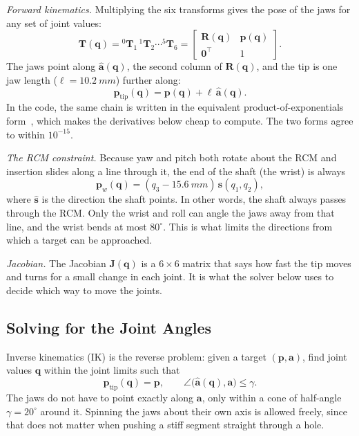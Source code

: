 \textit{Forward kinematics.} Multiplying the six transforms gives the pose of
the jaws for any set of joint values:
\begin{equation}
  \mathbf T(\mathbf q)={}^{0}\mathbf T_1\,{}^{1}\mathbf T_2\cdots{}^{5}\mathbf T_6
  =\begin{bmatrix}\mathbf R(\mathbf q)&\mathbf p(\mathbf q)\\\mathbf 0^\top&1\end{bmatrix}.
\end{equation}
The jaws point along $\hat{\mathbf a}(\mathbf q)$, the second column of
$\mathbf R(\mathbf q)$, and the tip is one jaw length
($\ell=\SI{10.2}{mm}$) further along:
\begin{equation}
  \mathbf p_{\mathrm{tip}}(\mathbf q)=\mathbf p(\mathbf q)+\ell\,\hat{\mathbf a}(\mathbf q).
\end{equation}
In the code, the same chain is written in the equivalent
product-of-exponentials form~\cite{lynch2017modern}, which makes the
derivatives below cheap to compute. The two forms agree to within
$10^{-15}$.

\textit{The RCM constraint.} Because yaw and pitch both rotate about the RCM
and insertion slides along a line through it, the end of the shaft (the
wrist) is always
\begin{equation}
  \mathbf p_w(\mathbf q)=(q_3-\SI{15.6}{mm})\,\hat{\mathbf s}(q_1,q_2),
\end{equation}
where $\hat{\mathbf s}$ is the direction the shaft points. In other words,
the shaft always passes through the RCM. Only the wrist and roll can angle
the jaws away from that line, and the wrist bends at most $80^\circ$. This is
what limits the directions from which a target can be approached.

\textit{Jacobian.} The Jacobian $\mathbf J(\mathbf q)$ is a $6\times6$ matrix
that says how fast the tip moves and turns for a small change in each joint.
It is what the solver below uses to decide which way to move the joints.

\subsection{Solving for the Joint Angles}\label{sec:ik}
Inverse kinematics (IK) is the reverse problem: given a target
$(\mathbf p,\mathbf a)$, find joint values $\mathbf q$ within the joint
limits such that
\begin{equation}
  \mathbf p_{\mathrm{tip}}(\mathbf q)=\mathbf p,
  \qquad
  \angle\big(\hat{\mathbf a}(\mathbf q),\mathbf a\big)\le\gamma .
\end{equation}
The jaws do not have to point exactly along $\mathbf a$, only within a cone
of half-angle $\gamma=20^\circ$ around it. Spinning the jaws about their own
axis is allowed freely, since that does not matter when pushing a stiff
segment straight through a hole.

